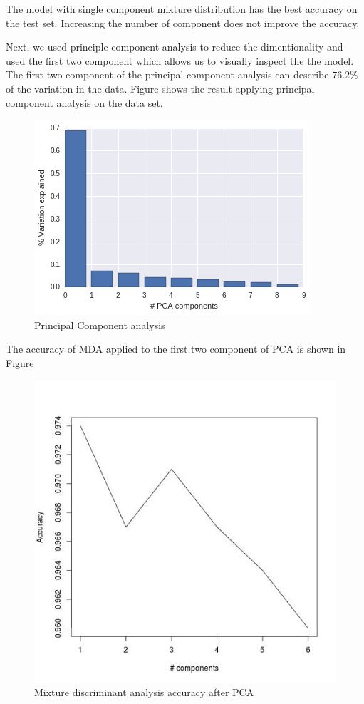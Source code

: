 \documentclass[12pt]{article}
\begin{document}
The model with single component mixture distribution has the best accuracy on the test set. Increasing the number of component does not improve the accuracy.

Next, we used principle component analysis to reduce the dimentionality and used the first two component which allows us to visually inspect the the model. The first two component of the principal component analysis can describe $76.2\%$ of the variation in the data. Figure \cite{pca} shows the result applying principal component analysis on the data set.
\begin{center}
\begin{figure}
\includegraphics[scale=.8]{pca.png}
\caption{Principal Component analysis}
\label{pca}
\end{figure}
\end{center}
The accuracy of MDA applied to the first two component of PCA is shown in Figure \cite{pca_acc}

\begin{figure}
\includegraphics[scale=.8]{pca_acc.jpeg}
\caption{Mixture discriminant analysis accuracy after PCA}
\label{pca_acc}
\end{figure}
\end{document}

